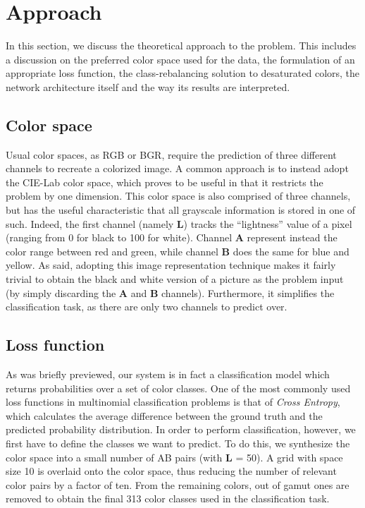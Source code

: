 \documentclass[twoside,twocolumn]{article}
\begin{document}

\section{Approach}
In this section, we discuss the theoretical approach to the problem. This includes a discussion on the preferred color space used for the data, the formulation of an appropriate loss function, the class-rebalancing solution to desaturated colors, the network architecture itself and the way its results are interpreted.


\subsection{Color space}
Usual color spaces, as RGB or BGR, require the prediction of three different channels to recreate a colorized image. A common approach is to instead adopt the CIE-Lab color space, which proves to be useful in that it restricts the problem by one dimension. This color space is also comprised of three channels, but has the useful characteristic that all grayscale information is stored in one of such. Indeed, the first channel (namely \textbf{L}) tracks the “lightness” value of a pixel (ranging from 0 for black to 100 for white). Channel \textbf{A} represent instead the color range between red and green, while channel \textbf{B} does the same for blue and yellow. As said, adopting this image representation technique makes it fairly trivial to obtain the black and white version of a picture as the problem input (by simply discarding the \textbf{A} and \textbf{B} channels). Furthermore, it simplifies the classification task, as there are only two channels to predict over.

\subsection{Loss function}
As was briefly previewed, our system is in fact a classification model which returns probabilities over a set of color classes. One of the most commonly used loss functions in multinomial classification problems is that of \textit{Cross Entropy}, which calculates the average difference between the ground truth and the predicted probability distribution. 
In order to perform classification, however, we first have to define the classes we want to predict. To do this, we synthesize the color space into a small number of AB pairs (with \textbf{L} = 50). A grid with space size 10 is overlaid onto the color space, thus reducing the number of relevant color pairs by a factor of ten. From the remaining colors, out of gamut ones are removed to obtain the final 313 color classes used in the classification task.
\end{document}

